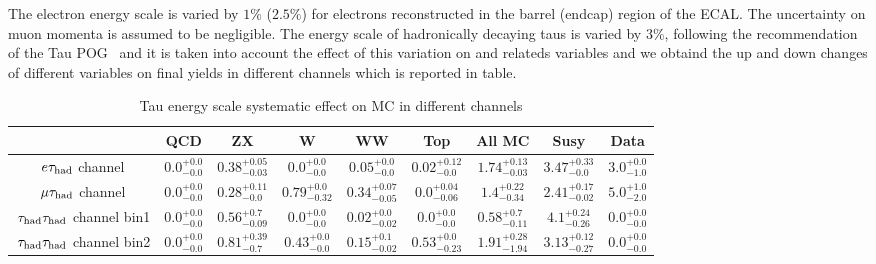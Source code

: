 The electron energy scale is varied by $1\%$ ($2.5\%$) for electrons reconstructed in the barrel (endcap) region of the ECAL.
The uncertainty on muon momenta is assumed to be negligible. The energy scale of hadronically decaying taus is varied by $3\%$, following the recommendation of the Tau POG~\cite{TauPOG} and it is taken into account the effect of this variation on \MET and \pt relateds variables and we obtaind the up and down changes of different variables on final yields in different channels which is reported in table.

\begin{table}[!h]
\begin{center}
\begin{tabular}{|c|c|c|c|c|c|c|c|c|}
\hline
                             & QCD & ZX    & W  & WW   & Top    & All MC & Susy & Data \\\hline 
$e\tau_{\rm had}$ channel           & $0.0 ^{+0.0} _{-0.0} $ & $0.38 ^{+0.05} _{-0.03}  $    &  $0.0 ^{+0.0} _{-0.0} $      &  $0.05 ^{+0.0} _{-0.0} $   &$0.02 ^{+0.12} _{-0.0} $           & $1.74 ^{+0.13} _{-0.03} $       & $3.47 ^{+0.33} _{-0.0} $ & $3.0 ^{+0.0} _{-1.0}$    \\\hline   

$\mu\tau_{\rm had}$ channel &  $0.0 ^{+0.0} _{-0.0} $     &  $0.28 ^{+0.11} _{-0.0} $      &  $0.79 ^{+0.0} _{-0.32} $  & $0.34 ^{+0.07} _{-0.05} $        &  $0.0 ^{+0.04} _{-0.06} $   &    $1.4 ^{+0.22} _{-0.34} $      &  $2.41 ^{+0.17} _{-0.02} $      & $5.0 ^{+1.0} _{-2.0} $     \\\hline  

$\,\tau_{\rm had}\tau_{\rm had}$ channel bin1 &  $0.0 ^{+0.0} _{-0.0}$   &    $0.56 ^{+0.7} _{-0.09}$    &  $0.0 ^{+0.0} _{-0.0}$      &  $0.02 ^{+0.0} _{-0.02}$        &   $0.0 ^{+0.0} _{-0.0}$        &    $0.58 ^{+0.7} _{-0.11}$     & $4.1^{+0.24} _{-0.26} $    & $0.0 ^{+0.0} _{-0.0}$\\\hline

$\,\tau_{\rm had}\tau_{\rm had}$ channel bin2 &  $0.0 ^{+0.0} _{-0.0}$   &     $0.81 ^{+0.39} _{-0.7}$     &    $0.43 ^{+0.0} _{-0.0}$     &     $0.15 ^{+0.1} _{-0.02}$     &   $0.53 ^{+0.0} _{-0.23}$   &      $1.91 ^{+0.28} _{-1.94}$     &     $3.13 ^{+0.12} _{-0.27}$   &  $0.0 ^{+0.0} _{-0.0}$    \\\hline
\end{tabular} 
\end{center}
\caption{Tau energy scale systematic effect on MC in different channels
}
\label{Tab.susyHiggs}
\end{table}     


